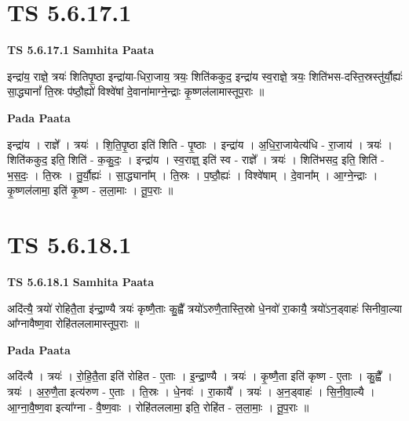 \documentclass[17pt]{extarticle}
\begin{document}

\section{ TS 5.6.17.1 }

\textbf{TS 5.6.17.1 } \newline
\textbf{Samhita Paata} \newline

इन्द्रा॑य॒ राज्ञे॒ त्रयः॑ शितिपृ॒ष्ठा इन्द्रा॑या-धिरा॒जाय॒ त्रयः॒ शिति॑ककुद॒ इन्द्रा॑य स्व॒राज्ञे॒ त्रयः॒ शिति॑भस-दस्ति॒स्रस्तु॑र्यौ॒ह्यः॑ सा॒द्ध्यानां᳚ ति॒स्रः प॑ष्ठौ॒ह्यो॑ विश्वे॑षां दे॒वाना॑माग्ने॒न्द्राः कृ॒ष्णल॑लामास्तूप॒राः ॥ \newline

\textbf{Pada Paata} \newline

इन्द्रा॑य । राज्ञे᳚ । त्रयः॑ । शि॒ति॒पृ॒ष्ठा इति॑ शिति - पृ॒ष्ठाः । इन्द्रा॑य । अ॒धि॒रा॒जायेत्य॑धि - रा॒जाय॑ । त्रयः॑ । शिति॑ककुद॒ इति॒ शिति॑ - क॒कु॒दः॒ । इन्द्रा॑य । स्व॒राज्ञ्॒ इति॑ स्व - राज्ञे᳚ । त्रयः॑ । शिति॑भसद॒ इति॒ शिति॑ - भ॒स॒दः॒ । ति॒स्रः । तु॒र्यौ॒ह्यः॑ । सा॒द्ध्याना᳚म् । ति॒स्रः । प॒ष्ठौ॒ह्यः॑ । विश्वे॑षाम् । दे॒वाना᳚म् । आ॒ग्ने॒न्द्राः । कृ॒ष्णल॑लामा॒ इति॑ कृ॒ष्ण - ल॒ला॒माः । तू॒प॒राः ॥  \newline





\section{ TS 5.6.18.1 }

\textbf{TS 5.6.18.1 } \newline
\textbf{Samhita Paata} \newline

अदि॑त्यै॒ त्रयो॑ रोहितै॒ता इ॑न्द्रा॒ण्यै त्रयः॑ कृष्णै॒ताः कु॒ह्वै᳚ त्रयो॑ऽरुणै॒तास्ति॒स्रो धे॒नवो॑ रा॒कायै॒ त्रयो॑ऽन॒ड्वाहः॑ सिनीवा॒ल्या आ᳚ग्नावैष्ण॒वा रोहि॑तललामास्तूप॒राः ॥ \newline

\textbf{Pada Paata} \newline

अदि॑त्यै । त्रयः॑ । रो॒हि॒तै॒ता इति॑ रोहित - ए॒ताः । इ॒न्द्रा॒ण्यै । त्रयः॑ । कृ॒ष्णै॒ता इति॑ कृष्ण - ए॒ताः । कु॒ह्वै᳚ । त्रयः॑ । अ॒रु॒णै॒ता इत्य॑रुण - ए॒ताः । ति॒स्रः । धे॒नवः॑ । रा॒कायै᳚ । त्रयः॑ । अ॒न॒ड्वाहः॑ । सि॒नी॒वा॒ल्यै । आ॒ग्ना॒वै॒ष्ण॒वा इत्या᳚ग्ना - वै॒ष्ण॒वाः । रोहि॑तललामा॒ इति॒ रोहि॑त - ल॒ला॒माः॒ । तू॒प॒राः ॥  \newline
\end{document}
